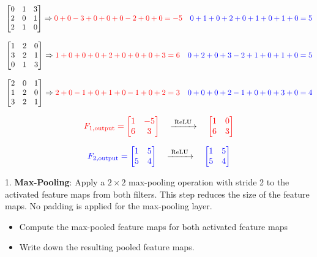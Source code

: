 \documentclass[a4 paper]{article}
\begin{document}
\[
\begin{bmatrix}
0 & 1 & 3 \\
2 & 0 & 1 \\
2 & 1 & 0
\end{bmatrix}
\Rightarrow
\color{red}{0+0-3+0+0+0-2+0+0=-5}
\quad
\color{blue}{0+1+0+2+0+1+0+1+0=5}
\]

\[
\begin{bmatrix}
1 & 2 & 0 \\
3 & 2 & 1 \\
0 & 1 & 3
\end{bmatrix}
\Rightarrow
\color{red}{1+0+0+0+2+0+0+0+3=6}
\quad
\color{blue}{0+2+0+3-2+1+0+1+0=5}
\]

\[
\begin{bmatrix}
2 & 0 & 1 \\
1 & 2 & 0 \\
3 & 2 & 1
\end{bmatrix}
\Rightarrow
\color{red}{2+0-1+0+1+0-1+0+2=3}
\quad
\color{blue}{0+0+0+2-1+0+0+3+0=4}
\]


\[
\textcolor{red}{F_{1,\text{output}} =
\begin{bmatrix}
1 & -5 \\
6 & 3
\end{bmatrix}}
\quad
\xrightarrow{\;\text{ReLU}\;}
\quad
\textcolor{red}{
\begin{bmatrix}
1 & 0 \\
6 & 3
\end{bmatrix}}
\]

\[
\textcolor{blue}{F_{2,\text{output}} =
\begin{bmatrix}
1 & 5 \\
5 & 4
\end{bmatrix}}
\quad
\xrightarrow{\;\text{ReLU}\;}
\quad
\textcolor{blue}{
\begin{bmatrix}
1 & 5 \\
5 & 4
\end{bmatrix}}
\]


1. \textbf{Max-Pooling}: Apply a $2 \times 2$ max-pooling operation with stride 2 to the activated feature maps from both filters. This step reduces the size of the feature maps. No padding is applied for the max-pooling layer.
    \begin{itemize}
        \item Compute the max-pooled feature maps for both activated feature maps
        \item Write down the resulting pooled feature maps.
    \end{itemize}
\end{document}
